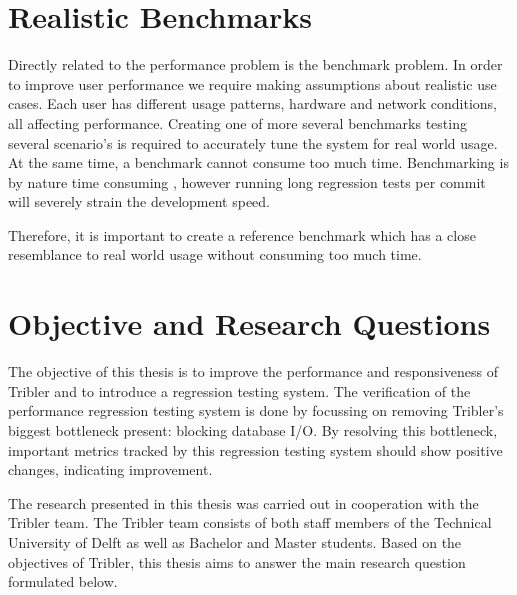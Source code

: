 
\section{Realistic Benchmarks}
Directly related to the performance problem is the benchmark problem.
In order to improve user performance we require making assumptions about realistic use cases.
Each user has different usage patterns, hardware and network conditions, all affecting performance.
Creating one of more several benchmarks testing several scenario's is required to accurately tune the system for real world usage.
At the same time, a benchmark cannot consume too much time.
Benchmarking is by nature time consuming \cite{huang2014performance}, however running long regression tests per commit will severely strain the development speed.

Therefore, it is important to create a reference benchmark which has a close resemblance to real world usage without consuming too much time.

\section{Objective and Research Questions}
\label{chp2:sct:objectives-research-questions}
The objective of this thesis is to improve the performance and responsiveness of Tribler and to introduce a regression testing system.
The verification of the performance regression testing system is done by focussing on removing Tribler's biggest bottleneck present: blocking database I/O.
By resolving this bottleneck, important metrics tracked by this regression testing system should show positive changes, indicating improvement.

The research presented in this thesis was carried out in cooperation with the Tribler team. 
The Tribler team consists of both staff members of the Technical University of Delft as well as Bachelor and Master students.
Based on the objectives of Tribler, this thesis aims to answer the main research question formulated below.\\

